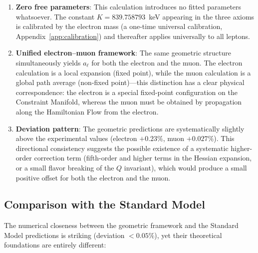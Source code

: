 \documentclass[aps,prd,reprint,nofootinbib]{revtex4-2}
\begin{document}
\begin{enumerate}
\item \textbf{Zero free parameters}: This calculation introduces no fitted parameters whatsoever. The constant $K = 839.758793$~keV appearing in the three axioms is calibrated by the electron mass (a one-time universal calibration, Appendix~\ref{app:calibration}) and thereafter applies universally to all leptons.

\item \textbf{Unified electron--muon framework}: The same geometric structure simultaneously yields $a_\ell$ for both the electron and the muon. The electron calculation is a local expansion (fixed point), while the muon calculation is a global path average (non-fixed point)---this distinction has a clear physical correspondence: the electron is a special fixed-point configuration on the Constraint Manifold, whereas the muon must be obtained by propagation along the Hamiltonian Flow from the electron.

\item \textbf{Deviation pattern}: The geometric predictions are systematically slightly above the experimental values (electron $+0.23\%$, muon $+0.027\%$). This directional consistency suggests the possible existence of a systematic higher-order correction term (fifth-order and higher terms in the Hessian expansion, or a small flavor breaking of the $Q$ invariant), which would produce a small positive offset for both the electron and the muon.
\end{enumerate}

\subsection{Comparison with the Standard Model}

The numerical closeness between the geometric framework and the Standard Model predictions is striking (deviation $< 0.05\%$), yet their theoretical foundations are entirely different:
\end{document}
